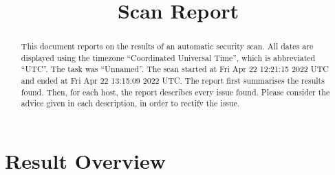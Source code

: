 \documentclass{article}
\title{Scan Report}
\begin{document}
\maketitle

\renewcommand{\abstractname}{Summary}
\begin{abstract}
This document reports on the results of an automatic security scan.
All dates are displayed using the timezone ``Coordinated Universal Time'', which is abbreviated ``UTC''.
The task was ``Unnamed''.  The scan started at Fri Apr 22 12:21:15 2022 UTC and ended at Fri Apr 22 13:15:09 2022 UTC.  The
report first summarises the results found.  Then, for each host,
the report describes every issue found.  Please consider the
advice given in each description, in order to rectify the issue.
\end{abstract}
\tableofcontents
\newpage
\section{Result Overview}
\end{document}

